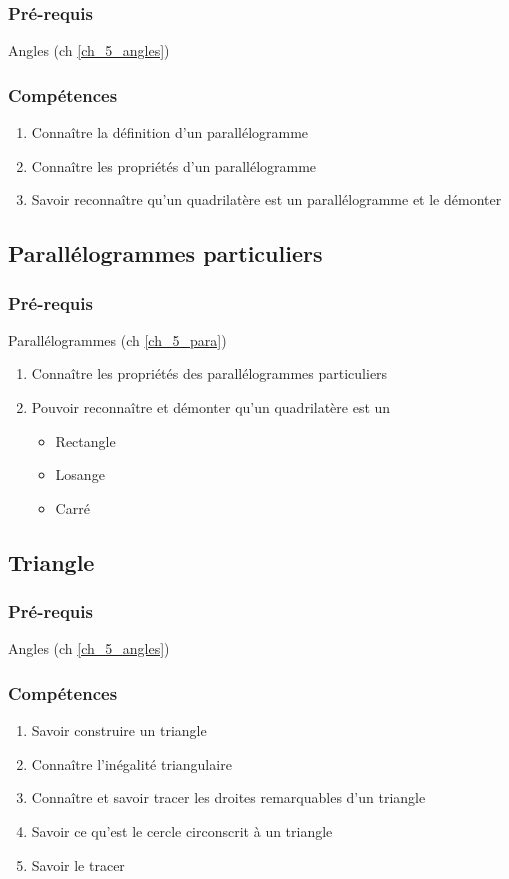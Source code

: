 \subsubsection*{Pré-requis}
Angles (ch \ref{ch_5_angles})

\subsubsection*{Compétences}
\begin{enumerate}
	\item Connaître la définition d'un parallélogramme
	\item Connaître les propriétés d'un parallélogramme
	\item Savoir reconnaître qu'un quadrilatère est un parallélogramme et le démonter
\end{enumerate}

\subsection{Parallélogrammes particuliers}\label{ch_5_para2}

\subsubsection*{Pré-requis}
Parallélogrammes (ch \ref{ch_5_para})
\begin{enumerate}
	\item Connaître les propriétés des parallélogrammes particuliers
	\item Pouvoir reconnaître et démonter qu'un quadrilatère est un 
		\begin{itemize}
			\item Rectangle
			\item Losange
			\item Carré
		\end{itemize}
\end{enumerate}

\subsection{Triangle}\label{ch_5_tri}

\subsubsection*{Pré-requis}

Angles (ch \ref{ch_5_angles})
\subsubsection*{Compétences}
	\begin{enumerate}
		\item Savoir construire un triangle
		\item Connaître l'inégalité triangulaire
		\item Connaître et savoir tracer les droites remarquables d'un triangle 
		\item Savoir ce qu'est le cercle circonscrit à un triangle
		\item Savoir le tracer
	\end{enumerate}
	
